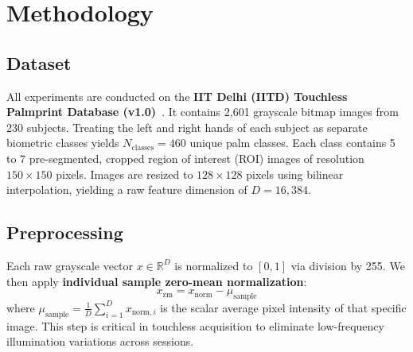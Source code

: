 \documentclass[conference]{IEEEtran}
\begin{document}
\section{Methodology}
\label{sec:methodology}

\subsection{Dataset}
All experiments are conducted on the \textbf{IIT Delhi (IITD) Touchless Palmprint Database (v1.0)}~\cite{kumar2008incorporating}. It contains 2,601 grayscale bitmap images from 230 subjects. Treating the left and right hands of each subject as separate biometric classes yields $N_{\text{classes}} = 460$ unique palm classes. Each class contains 5 to 7 pre-segmented, cropped region of interest (ROI) images of resolution $150 \times 150$ pixels. Images are resized to $128 \times 128$ pixels using bilinear interpolation, yielding a raw feature dimension of $D = 16,384$. 

\subsection{Preprocessing}
Each raw grayscale vector $x \in \mathbb{R}^D$ is normalized to $[0, 1]$ via division by 255. We then apply \textbf{individual sample zero-mean normalization}:
\begin{equation}
    x_{\text{zm}} = x_{\text{norm}} - \mu_{\text{sample}}
    \label{eq:zeromean}
\end{equation}
where $\mu_{\text{sample}} = \frac{1}{D} \sum_{i=1}^D x_{\text{norm}, i}$ is the scalar average pixel intensity of that specific image. This step is critical in touchless acquisition to eliminate low-frequency illumination variations across sessions.
\end{document}
